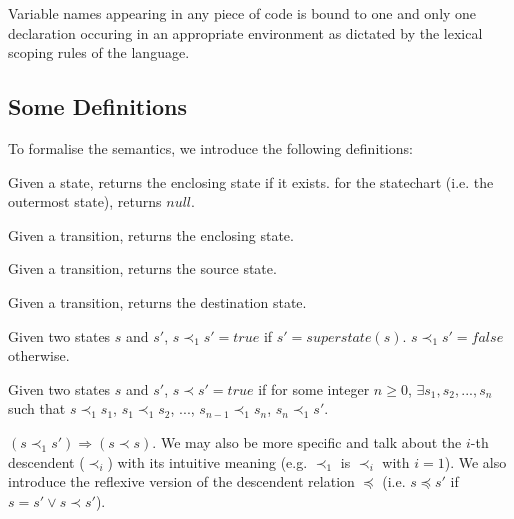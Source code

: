 \documentclass[12pt,a4paper]{article}
\begin{document}
Variable names appearing in any piece of code is bound to one and only one declaration occuring in an appropriate environment as dictated by the lexical scoping rules of the language.

\subsection{Some Definitions}
To formalise the semantics, we introduce the following definitions:

\begin{definition} \label{d:ss}
	Given a state, returns the enclosing state if it exists. for the statechart (i.e. the outermost state), returns $null$.
\end{definition}

\begin{definition} \label{d:s}
	Given a transition, returns the enclosing state.
\end{definition}

\begin{definition} \label{d:src}
	Given a transition, returns the source state.
\end{definition}

\begin{definition} \label{d:dest}
	Given a transition, returns the destination state.
\end{definition}

\begin{definition} \label{d:cs}
	Given two states $s$ and $s'$, $s \prec_1 s' = true$ if $s' = superstate(s)$. $s \prec_1 s' = false$ otherwise.
\end{definition}

\begin{definition} \label{d:desc}
	Given two states $s$ and $s'$, $s \prec s' = true$ if for some integer $n \geq 0$, $\exists s_1, s_2, ..., s_n$ such that $s \prec_1 s_1$, $s_1 \prec_1 s_2$, ..., $s_{n - 1} \prec_1 s_n$, $s_n \prec_1 s'$.
\end{definition}

$(s \prec_1 s') \Rightarrow (s \prec s)$. We may also be more specific and talk about the $i$-th descendent ($\prec_i$) with its intuitive meaning (e.g. $\prec_1$ is $\prec_i$ with $i = 1$). We also introduce the reflexive version of the descendent relation $\preceq$ (i.e. $s \preceq s'$ if $s = s' \lor s \prec s'$).
\end{document}
